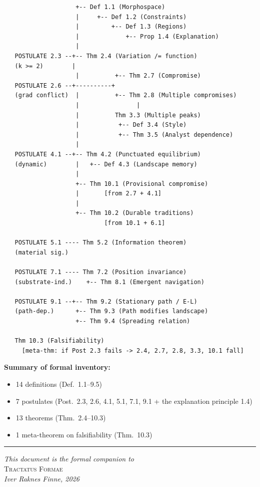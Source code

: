\documentclass[11pt, a4paper]{article}
\theoremstyle{definition}
\theoremstyle{plain}
\theoremstyle{remark}
\begin{document}
\medskip
\begin{small}
\begin{verbatim}
                    +-- Def 1.1 (Morphospace)
                    |     +-- Def 1.2 (Constraints)
                    |         +-- Def 1.3 (Regions)
                    |             +-- Prop 1.4 (Explanation)
                    |
   POSTULATE 2.3 --+-- Thm 2.4 (Variation /= function)
   (k >= 2)        |
                    |          +-- Thm 2.7 (Compromise)
   POSTULATE 2.6 --+----------+
   (grad conflict)  |          +-- Thm 2.8 (Multiple compromises)
                    |                |
                    |          Thm 3.3 (Multiple peaks)
                    |           +-- Def 3.4 (Style)
                    |           +-- Thm 3.5 (Analyst dependence)
                    |
   POSTULATE 4.1 --+-- Thm 4.2 (Punctuated equilibrium)
   (dynamic)        |   +-- Def 4.3 (Landscape memory)
                    |
                    +-- Thm 10.1 (Provisional compromise)
                    |       [from 2.7 + 4.1]
                    |
                    +-- Thm 10.2 (Durable traditions)
                            [from 10.1 + 6.1]

   POSTULATE 5.1 ---- Thm 5.2 (Information theorem)
   (material sig.)

   POSTULATE 7.1 ---- Thm 7.2 (Position invariance)
   (substrate-ind.)    +-- Thm 8.1 (Emergent navigation)

   POSTULATE 9.1 --+-- Thm 9.2 (Stationary path / E-L)
   (path-dep.)      +-- Thm 9.3 (Path modifies landscape)
                    +-- Thm 9.4 (Spreading relation)

   Thm 10.3 (Falsifiability)
     [meta-thm: if Post 2.3 fails -> 2.4, 2.7, 2.8, 3.3, 10.1 fall]
\end{verbatim}
\end{small}

\medskip\noindent
\textbf{Summary of formal inventory:}
\begin{itemize}[nosep]
  \item 14 definitions (Def.~1.1--9.5)
  \item 7 postulates (Post.~2.3, 2.6, 4.1, 5.1, 7.1, 9.1 + the
    explanation principle 1.4)
  \item 13 theorems (Thm.~2.4--10.3)
  \item 1 meta-theorem on falsifiability (Thm.~10.3)
\end{itemize}

\vfill
\begin{center}
\rule{4cm}{0.4pt}

\medskip
{\small\itshape This document is the formal companion to}\\
{\small\scshape Tractatus Formae}\\
{\small\itshape Iver Raknes Finne, 2026}
\end{center}

\newpage
\printbibliography[title={References}]
\end{document}
